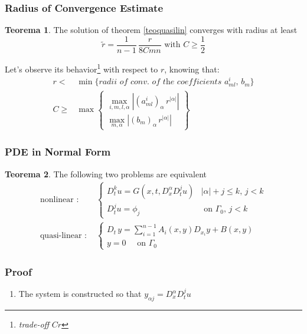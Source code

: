 \documentclass[serif,notheorems]{beamer}
\theoremstyle{definition} %
\newtheorem{theorem}{Teorema}[section] %
\theoremstyle{remark}
\begin{document}
\begin{frame}
\frametitle{Radius of Convergence Estimate}
\begin{theorem}
The solution of theorem \ref{teoquasilin} converges with radius at least
$$\widetilde{r} = \dfrac{1}{n-1}\, \dfrac{r}{8Cmn} \text{ with } C \geq \frac{1}{2}$$
\end{theorem}

Let's observe its behavior\footnote{\textit{trade-off} $Cr$} with respect to $r$, knowing that:
\begin{align*}
r <& \min \{ \textit{radii of conv. of the coefficients } a^i_{ml}, \, b_m\} \\
C \geq & \max \begin{Bmatrix}
\max\limits_{i,m,l,\alpha } \left| (a^i_{ml})_\alpha \, r^{|\alpha |}\right|\\
\max\limits_{m,\alpha} \left|(b_m)_\alpha \, r^{|\alpha |}\right|
\end{Bmatrix}
\end{align*}
\end{frame}

\begin{frame}
\frametitle{PDE in Normal Form}
\begin{theorem}
The following two problems are equivalent
\begin{align*}
\text{nonlinear : }&
\begin{cases}
D_{t}^k u = G(x,t, D^\alpha_x D^j_t u) & |\alpha |+ j \leq k, \, j<k \\
D_t^ju = \phi_j & \text{ on } \Gamma_0, \, j<k
\end{cases} \\
\text{quasi-linear : }&
\begin{cases}
D_t \, y = \sum\limits_{i=1}^{n-1} A_i(x,y)D_{x_i}y+B(x,y) \; \\
y=0 \quad \text{ on } \Gamma_0
\end{cases}
\end{align*}
\end{theorem}
\end{frame}

\begin{frame}
\frametitle{Proof}
\begin{enumerate}
\item The system is constructed so that $y_{\alpha j}= D^\alpha_x D^j_t u$
\end{enumerate}
\end{frame}
\end{document}
